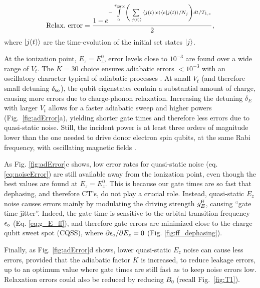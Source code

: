 \begin{equation}\label{eq:relaxError}
{\rm Relax.~error}=\frac{1-e^{-\int\limits_{0}^{\tau_{\rm gate}}\left({\sum\limits_{\ket{j(t)}}{\braket{j(t)|e}\braket{e|j(t)}/N_j
}}\right)dt/T_{1, \rm c}}}{2},
\end{equation}
where $\ket{j(t)}$ are the time-evolution of the initial set states $\ket{j}$. 


 At the ionization point, $E_z=E_z^0$, error levels close to $10^{-3}$ are found over a wide range of $V_t$. The $K=30$ choice ensures adiabatic errors $<10^{-3}$ with an oscillatory character typical of adiabatic processes \cite{Oh2013}. At small $V_t$ (and therefore small detuning $\delta_{\rm so}$), the qubit eigenstates contain a substantial amount of charge, causing more errors due to charge-phonon relaxation. Increasing the detuning $\delta_E$ with larger $V_t$ allows for a faster adiabatic sweep and higher powers (Fig.~\ref{fig:adError}a), yielding shorter gate times and therefore less errors due to quasi-static noise. Still, the incident power is at least three orders of magnitude lower than the one needed to drive donor electron spin qubits, at the same Rabi frequency, with oscillating magnetic fields \cite{Pla2012,Muhonen2014}.

As Fig. \ref{fig:adError}c shows, low error rates for quasi-static noise (eq. \eqref{eq:noiseError}) are still available away from the ionization point, even though the best values are found at $E_z=E_z^0$. This is because our gate times are so fast that dephasing, and therefore CT's, do not play a crucial role. Instead, quasi-static $E_z$ noise causes errors mainly by modulating the driving strength $g_E^{\rm ff}$, causing ``gate time jitter''. Indeed, the gate time is sensitive to the orbital transition frequency $\epsilon_{\rm o}$ (Eq. \ref{eq:g_E_ff}), and therefore gate errors are minimized close to the charge qubit sweet spot (CQSS), where $\partial\epsilon_{\rm o}/\partial E_z=0$ (Fig. \ref{fig:ff_dephasing}).

Finally, as Fig. \ref{fig:adError}d shows, lower quasi-static $E_z$ noise can cause less errors, provided that the adiabatic factor $K$ is increased, to reduce leakage errors, up to an optimum value where gate times are still fast as to keep noise errors low. Relaxation errors could also be reduced by reducing $B_0$ (recall Fig.~\ref{fig:T1}).

